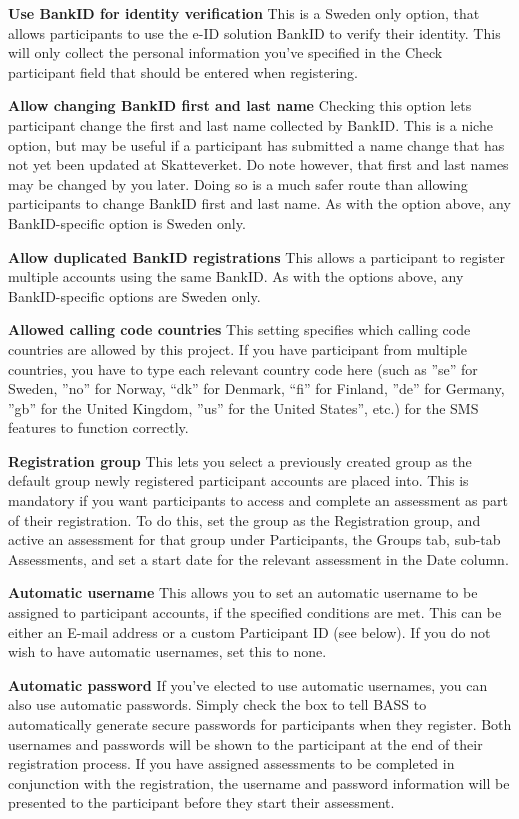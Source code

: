 \documentclass[
]{book}
\begin{document}
\textbf{Use BankID for identity verification}
This is a Sweden only option, that allows participants to use the e-ID solution BankID to verify their identity. This will only collect the personal information you've specified in the Check participant field that should be entered when registering.

\textbf{Allow changing BankID first and last name}
Checking this option lets participant change the first and last name collected by BankID. This is a niche option, but may be useful if a participant has submitted a name change that has not yet been updated at Skatteverket. Do note however, that first and last names may be changed by you later. Doing so is a much safer route than allowing participants to change BankID first and last name. As with the option above, any BankID-specific option is Sweden only.

\textbf{Allow duplicated BankID registrations}
This allows a participant to register multiple accounts using the same BankID. As with the options above, any BankID-specific options are Sweden only.

\textbf{Allowed calling code countries}
This setting specifies which calling code countries are allowed by this project. If you have participant from multiple countries, you have to type each relevant country code here (such as ''se'' for Sweden, ''no'' for Norway, ``dk'' for Denmark, ``fi'' for Finland, ''de'' for Germany, ''gb'' for the United Kingdom, ''us'' for the United States'', etc.) for the SMS features to function correctly.

\textbf{Registration group}
This lets you select a previously created group as the default group newly registered participant accounts are placed into. This is mandatory if you want participants to access and complete an assessment as part of their registration.
To do this, set the group as the Registration group, and active an assessment for that group under Participants, the Groups tab, sub-tab Assessments, and set a start date for the relevant assessment in the Date column.

\textbf{Automatic username}
This allows you to set an automatic username to be assigned to participant accounts, if the specified conditions are met. This can be either an E-mail address or a custom Participant ID (see below). If you do not wish to have automatic usernames, set this to none.

\textbf{Automatic password}
If you've elected to use automatic usernames, you can also use automatic passwords. Simply check the box to tell BASS to automatically generate secure passwords for participants when they register. Both usernames and passwords will be shown to the participant at the end of their registration process. If you have assigned assessments to be completed in conjunction with the registration, the username and password information will be presented to the participant before they start their assessment.
\end{document}
